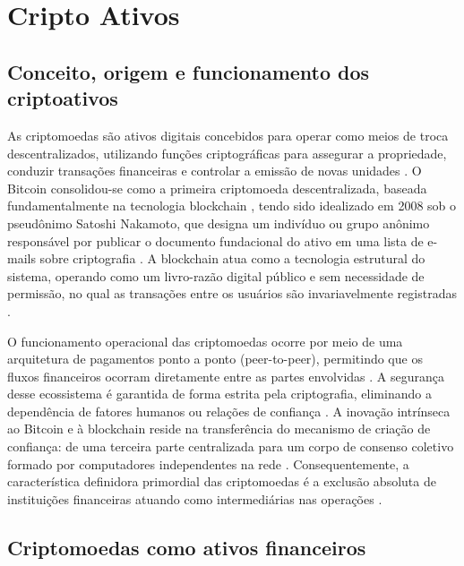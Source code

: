 \section{Cripto Ativos}
\label{sec_cripto_ativos}

\subsection{Conceito, origem e funcionamento dos criptoativos}
\label{subsec_conceito_origem_e_funcionamento_dos_criptoativos}

As criptomoedas são ativos digitais concebidos para operar como meios de troca descentralizados, utilizando funções criptográficas para assegurar a propriedade, conduzir transações financeiras e controlar a emissão de novas unidades \cite{doran2014forensic,ballis2020herding,chevallier2021forecast}. O Bitcoin consolidou-se como a primeira criptomoeda descentralizada, baseada fundamentalmente na tecnologia blockchain \cite{fakhfekh2020volatility}, tendo sido idealizado em 2008 sob o pseudônimo Satoshi Nakamoto, que designa um indivíduo ou grupo anônimo responsável por publicar o documento fundacional do ativo em uma lista de e-mails sobre criptografia \cite{charfeddine2020investigating}. A blockchain atua como a tecnologia estrutural do sistema, operando como um livro-razão digital público e sem necessidade de permissão, no qual as transações entre os usuários são invariavelmente registradas \cite{sebastiao2021forecasting}.

O funcionamento operacional das criptomoedas ocorre por meio de uma arquitetura de pagamentos ponto a ponto (peer-to-peer), permitindo que os fluxos financeiros ocorram diretamente entre as partes envolvidas \cite{wang2020stablecoins}. A segurança desse ecossistema é garantida de forma estrita pela criptografia, eliminando a dependência de fatores humanos ou relações de confiança \cite{narayanan2016bitcoin}. A inovação intrínseca ao Bitcoin e à blockchain reside na transferência do mecanismo de criação de confiança: de uma terceira parte centralizada para um corpo de consenso coletivo formado por computadores independentes na rede \cite{charfeddine2020investigating}. Consequentemente, a característica definidora primordial das criptomoedas é a exclusão absoluta de instituições financeiras atuando como intermediárias nas operações \cite{harwick2016cryptocurrency,wang2020stablecoins}.

\subsection{Criptomoedas como ativos financeiros}
\label{subsec_criptomoedas_como_ativos_financeiros}

